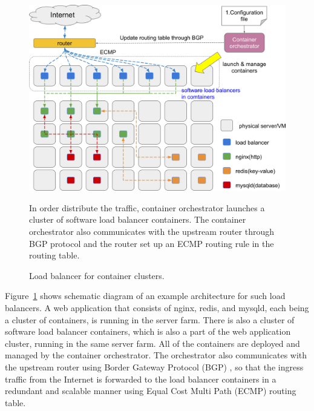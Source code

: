 \begin{figure}[h]
\begin{center}
\includegraphics[width=0.9\columnwidth]{Figs/cluster_of_container_loadbalancer}
\end{center}
\caption{
Load balancer for container clusters.
}
\centering\parbox[c]{0.9\columnwidth}{
In order distribute the traffic, container orchestrator launches a cluster of software load balancer containers. 
The container orchestrator also communicates with the upstream router through BGP protocol and the router set up an ECMP routing rule in the routing table.
}
\label{fig:cluster_of_container_loadbalancer}
\end{figure}

Figure~\ref{fig:cluster_of_container_loadbalancer} shows schematic diagram of an example architecture for such load balancers.
A web application that consists of nginx, redis, and mysqld, each being a cluster of containers, is running in the server farm.
There is also a cluster of software load balancer containers, which is also a part of the web application cluster, running in the same server farm. 
All of the containers are deployed and managed by the container orchestrator.
The orchestrator also communicates with the upstream router using Border Gateway Protocol (BGP) \cite{rfc7911}, so that the ingress traffic from the Internet is forwarded to the  load balancer containers in a redundant and scalable manner using Equal Cost Multi Path (ECMP) \cite{al2008scalable} routing table.


